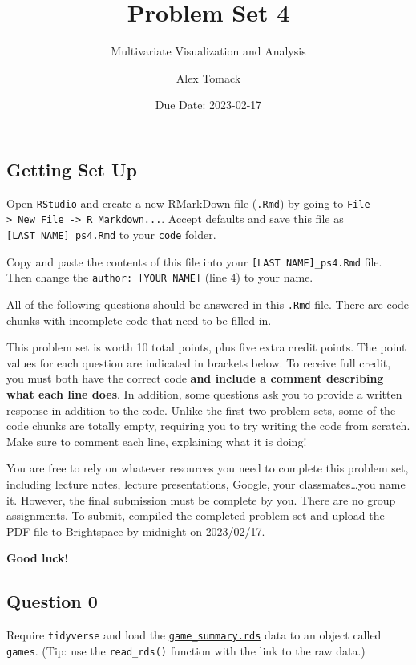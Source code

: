 \documentclass[
]{article}
\title{Problem Set 4}
\subtitle{Multivariate Visualization and Analysis}
\author{Alex Tomack}
\date{Due Date: 2023-02-17}
\begin{document}
\maketitle

\hypertarget{getting-set-up}{%
\subsection{Getting Set Up}\label{getting-set-up}}

Open \texttt{RStudio} and create a new RMarkDown file (\texttt{.Rmd}) by
going to
\texttt{File\ -\textgreater{}\ New\ File\ -\textgreater{}\ R\ Markdown...}.
Accept defaults and save this file as \texttt{{[}LAST\ NAME{]}\_ps4.Rmd}
to your \texttt{code} folder.

Copy and paste the contents of this file into your
\texttt{{[}LAST\ NAME{]}\_ps4.Rmd} file. Then change the
\texttt{author:\ {[}YOUR\ NAME{]}} (line 4) to your name.

All of the following questions should be answered in this \texttt{.Rmd}
file. There are code chunks with incomplete code that need to be filled
in.

This problem set is worth 10 total points, plus five extra credit
points. The point values for each question are indicated in brackets
below. To receive full credit, you must both have the correct code
\textbf{and include a comment describing what each line does}. In
addition, some questions ask you to provide a written response in
addition to the code. Unlike the first two problem sets, some of the
code chunks are totally empty, requiring you to try writing the code
from scratch. Make sure to comment each line, explaining what it is
doing!

You are free to rely on whatever resources you need to complete this
problem set, including lecture notes, lecture presentations, Google,
your classmates\ldots you name it. However, the final submission must be
complete by you. There are no group assignments. To submit, compiled the
completed problem set and upload the PDF file to Brightspace by midnight
on 2023/02/17.

\textbf{Good luck!}

\hypertarget{question-0}{%
\subsection{Question 0}\label{question-0}}

Require \texttt{tidyverse} and load the
\href{https://github.com/jbisbee1/DS1000_S2023/blob/main/Lectures/4_Uni_Multivariate/data/game_summary.Rds?raw=true\textquotesingle{}}{\texttt{game\_summary.rds}}
data to an object called \texttt{games}. (Tip: use the
\texttt{read\_rds()} function with the link to the raw data.)
\end{document}
